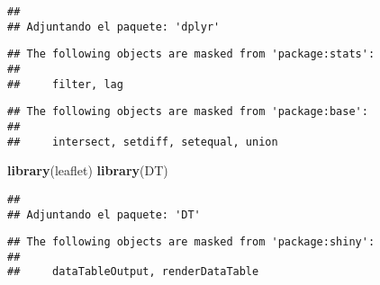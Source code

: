 \documentclass[
]{article}
\newenvironment{Shaded}{\begin{snugshade}}{\end{snugshade}}
\newcommand{\FunctionTok}[1]{\textcolor[rgb]{0.13,0.29,0.53}{\textbf{#1}}}
\newcommand{\NormalTok}[1]{#1}
\begin{document}
\begin{verbatim}
## 
## Adjuntando el paquete: 'dplyr'
\end{verbatim}

\begin{verbatim}
## The following objects are masked from 'package:stats':
## 
##     filter, lag
\end{verbatim}

\begin{verbatim}
## The following objects are masked from 'package:base':
## 
##     intersect, setdiff, setequal, union
\end{verbatim}

\begin{Shaded}
\begin{Highlighting}[]
\FunctionTok{library}\NormalTok{(leaflet)}
\FunctionTok{library}\NormalTok{(DT)}
\end{Highlighting}
\end{Shaded}

\begin{verbatim}
## 
## Adjuntando el paquete: 'DT'
\end{verbatim}

\begin{verbatim}
## The following objects are masked from 'package:shiny':
## 
##     dataTableOutput, renderDataTable
\end{verbatim}
\end{document}

